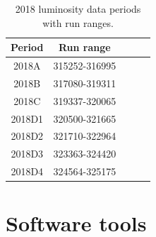

\begin{table}
  \begin{center}
    \begin{tabular}{ccccc}  
    \textbf{Period}   & \textbf{Run range} \\ \hline
     2018A      &        315252-316995         \\ 
     2018B      &        317080-319311         \\ 
     2018C      &        319337-320065         \\ 
     2018D1     &        320500-321665        \\ 
     2018D2     &        321710-322964         \\ 
     2018D3     &        323363-324420         \\ 
     2018D4     &        324564-325175        \\ 
      \end{tabular}
    \caption{2018 luminosity data periods with run ranges.}
    \label{tab:period run ranges}
  \end{center}
\end{table}


\section{Software tools}

 
